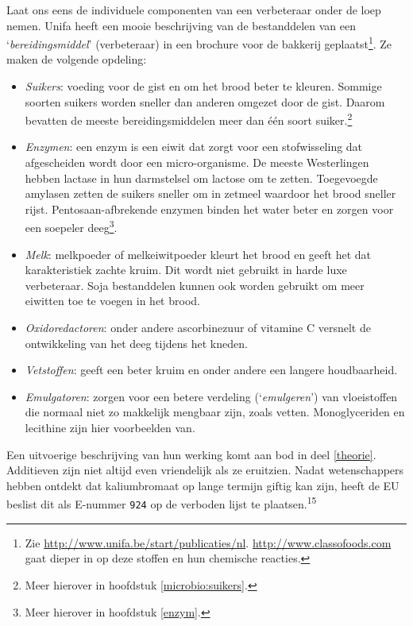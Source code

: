\documentclass[
  11pt,
  dutch,
]{memoir}
\providecommand{\tightlist}{%
  \setlength{\itemsep}{0pt}\setlength{\parskip}{0pt}}
\begin{document}
Laat ons eens de individuele componenten van een verbeteraar onder de
loep nemen. Unifa heeft een mooie beschrijving van de bestanddelen van
een `\emph{bereidingsmiddel}' (verbeteraar) in een brochure voor de
bakkerij geplaatst\footnote{Zie
  \url{http://www.unifa.be/start/publicaties/nl}.
  \url{http://www.classofoods.com} gaat dieper in op deze stoffen en hun
  chemische reacties.}. Ze maken de volgende opdeling:

\begin{itemize}
\tightlist
\item
  \emph{Suikers}: voeding voor de gist en om het brood beter te kleuren.
  Sommige soorten suikers worden sneller dan anderen omgezet door de
  gist. Daarom bevatten de meeste bereidingsmiddelen meer dan één soort
  suiker.\footnote{Meer hierover in hoofdstuk \ref{microbio:suikers}.}
\item
  \emph{Enzymen}: een enzym is een eiwit dat zorgt voor een
  stofwisseling dat afgescheiden wordt door een micro-organisme. De
  meeste Westerlingen hebben lactase in hun darmstelsel om lactose om te
  zetten. Toegevoegde amylasen zetten de suikers sneller om in zetmeel
  waardoor het brood sneller rijst. Pentosaan-afbrekende enzymen binden
  het water beter en zorgen voor een soepeler deeg\footnote{Meer
    hierover in hoofdstuk \ref{enzym}.}.
\item
  \emph{Melk}: melkpoeder of melkeiwitpoeder kleurt het brood en geeft
  het dat karakteristiek zachte kruim. Dit wordt niet gebruikt in harde
  luxe verbeteraar. Soja bestanddelen kunnen ook worden gebruikt om meer
  eiwitten toe te voegen in het brood.
\item
  \emph{Oxidoredactoren}: onder andere ascorbinezuur of vitamine C
  versnelt de ontwikkeling van het deeg tijdens het kneden.
\item
  \emph{Vetstoffen}: geeft een beter kruim en onder andere een langere
  houdbaarheid.
\item
  \emph{Emulgatoren}: zorgen voor een betere verdeling
  (`\emph{emulgeren}') van vloeistoffen die normaal niet zo makkelijk
  mengbaar zijn, zoals vetten. Monoglyceriden en lecithine zijn hier
  voorbeelden van.
\end{itemize}

Een uitvoerige beschrijving van hun werking komt aan bod in deel
\ref{theorie}. Additieven zijn niet altijd even vriendelijk als ze
eruitzien. Nadat wetenschappers hebben ontdekt dat kaliumbromaat op
lange termijn giftig kan zijn, heeft de EU beslist dit als E-nummer
\texttt{924} op de verboden lijst te plaatsen.\textsuperscript{15}
\end{document}
